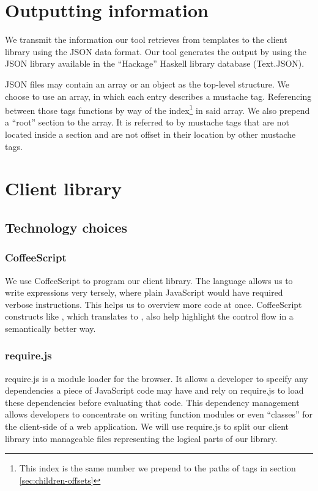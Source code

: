 \documentclass[thesis.tex]{subfiles}
\begin{document}
\section{Outputting information}
\label{sec:output}
We transmit the information our tool retrieves from templates to the client
library using the JSON data format. Our tool generates the output by using the
JSON library available in the ``Hackage'' Haskell library database (Text.JSON).

JSON files may contain an array or an object as the top-level structure.
We choose to use an array, in which each entry describes a mustache tag.
Referencing between those tags functions by way of the index\footnote{
	This index is the same number we prepend to the paths of tags in section
	\ref{sec:children-offsets}
} in said array.
We also prepend a ``root'' section to the array. It is referred to by mustache
tags that are not located inside a section and are not offset in their location
by other mustache tags.



\section{Client library}

\subsection{Technology choices}

\subsubsection{CoffeeScript}
\label{sec:coffeescript}
We use CoffeeScript to program our client library.
The language allows us to write expressions very tersely, where plain JavaScript
would have required verbose instructions. This helps us to overview more code at
once.
CoffeeScript constructs like , which translates to
, also help highlight the control flow in a semantically
better way.

\subsubsection{require.js}
\label{sec:requirejs}
require.js is a module loader for the browser. It allows a developer to specify
any dependencies a piece of JavaScript code may have and rely on require.js to
load these dependencies before evaluating that code. This dependency management
allows developers to concentrate on writing function modules or even ``classes''
for the client-side of a web application. We will use require.js to split our
client library into manageable files representing the logical parts of our
library.
\end{document}
